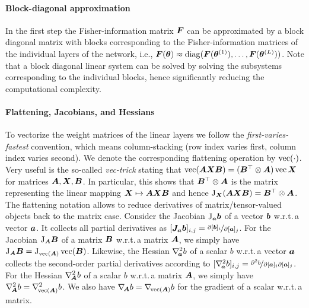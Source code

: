 \paragraph{Block-diagonal approximation}
In the first step the Fisher-information matrix ${\bm{F}}$ can be approximated by a block diagonal matrix with blocks corresponding to the Fisher-information matrices of the individual layers of the network, i.e., ${\bm{F}}({\bm{\theta}}) \approx \operatorname{diag}({\bm{F}}({\bm{\theta}}^{(1)}), \dots, {\bm{F}}({\bm{\theta}}^{(L)}))$. 
Note that a block diagonal linear system can be solved by solving the subsystems corresponding to the individual blocks, hence significantly reducing the computational complexity. 

\paragraph{Flattening, Jacobians, and Hessians}
To vectorize the weight matrices of the linear layers we follow the %
\emph{first-varies-fastest} convention, which means column-stacking (row index varies first, column index varies second).
We denote the corresponding flattening operation by $\operatorname{vec}(\cdot)$.
Very useful is the so-called \emph{vec-trick} stating that $\operatorname{vec}({\bm{A}}{\bm{X}}{\bm{B}}) = ({\bm{B}}^\top\otimes {\bm{A}})\operatorname{vec}{{\bm{X}}}$
for matrices ${\bm{A}}, {\bm{X}}, {\bm{B}}$.
In particular, this shows that ${\bm{B}}^\top\otimes {\bm{A}}$ is the matrix representing the linear mapping ${\bm{X}}\mapsto {\bm{A}}{\bm{X}}{\bm{B}}$ and hence $\mathrm{J}_{\bm{X}}({\bm{A}}{\bm{X}}{\bm{B}}) = {\bm{B}}^\top\otimes {\bm{A}}$.
The flattening notation allows to reduce derivatives of matrix/tensor-valued objects back to the matrix case.
Consider the Jacobian $\mathrm{J}_{{\bm{a}}}{\bm{b}}$ of a vector ${\bm{b}}$ w.r.t.\,a vector ${\bm{a}}$.
It collects all partial derivatives as $[{\bm{J}}_{{\bm{a}}}{\bm{b}}]_{i,j} = \nicefrac{\partial [{\bm{b}}]_i}{\partial [{\bm{a}}]_j}$.
For the Jacobian $\mathrm{J}_{{\bm{A}}}{\bm{B}}$ of a matrix ${\bm{B}}$ w.r.t.\,a matrix ${\bm{A}}$, we simply have $\mathrm{J}_{{\bm{A}}} {\bm{B}} = \mathrm{J}_{\operatorname{vec}( {\bm{A}} )}\operatorname{vec}({\bm{B}})$.
Likewise, the Hessian $\nabla_{\!{{\bm{a}}}}^{2}b$ of a scalar $b$ w.r.t.\,a vector ${\bm{a}}$ collects the second-order partial derivatives according to $[\nabla_{\!{{\bm{a}}}}^{2}b]_{i,j} = \nicefrac{\partial^2 b}{\partial [{\bm{a}}]_i \partial [{\bm{a}}]_j}$.
For the Hessian $\nabla_{\!{{\bm{A}}}}^{2} b$ of a scalar $b$ w.r.t.\,a matrix ${\bm{A}}$, we simply have $\nabla_{\!{{\bm{A}}}}^{2} b = \nabla_{\!{\operatorname{vec}({\bm{A}})}}^{2}b$.
We also have $\nabla_{\!{{\bm{A}}}} b = \nabla_{\!{\operatorname{vec}({\bm{A}})}} b$ for the gradient of a scalar w.r.t.\,a matrix.

